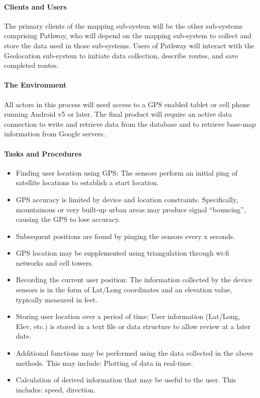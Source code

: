 ﻿\documentclass{article}
\begin{document}
\paragraph{Clients and Users}
The primary clients of the mapping sub-system will be the other sub-systems comprising Pathway, who will depend on the mapping sub-system to collect and store the data used in those sub-systems. Users of Pathway will interact with the Geolocation sub-system to initiate data collection, describe routes, and save completed routes.

\paragraph{The Environment}
All actors in this process will need access to a GPS enabled tablet or cell phone running Android v5 or later.  The final product will require an active data connection to write and retrieve data from the database and to retrieve base-map information from Google servers.

\paragraph{Tasks and Procedures}
\begin{itemize}
\item Finding user location using GPS: The sensors perform an initial ping of satellite locations to establish a start location.
\item GPS accuracy is limited by device and location constraints. Specifically, mountainous or very built-up urban areas may produce signal “bouncing”, causing the GPS to lose accuracy.
\item Subsequent positions are found by pinging the sensors every x seconds.
\item GPS location may be supplemented using triangulation through wi-fi networks and cell towers.
\item Recording the current user position: The information collected by the device sensors is in the form of Lat/Long coordinates and an elevation value, typically measured in feet.
\item Storing user location over a period of time: User information (Lat/Long, Elev, etc.) is stored in a text file or data structure to allow review at a later date.
\item Additional functions may be performed using the data collected in the above methods. This may include: Plotting of data in real-time.
\item Calculation of derived information that may be useful to the user. This includes: speed, direction.
\end{itemize}
\end{document}
